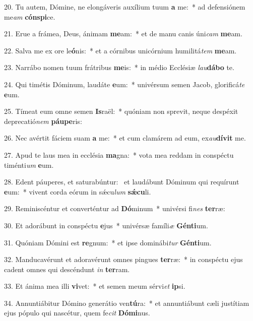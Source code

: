 20. Tu autem, Dómine, ne elongáveris auxílium tuum \textbf{a} me:~*  ad defensiónem me\textit{am} \textbf{cón}\textbf{spi}ce.\

21. Erue a frámea, Deus, ánimam \textbf{me}am:~*  et de manu canis úni\textit{cam} \textbf{me}am.\

22. Salva me ex ore le\textbf{ó}nis:~*  et a córnibus unicórnium humilitá\textit{tem} \textbf{me}am.\

23. Narrábo nomen tuum frátribus \textbf{me}is:~*  in médio Ecclésiæ \textit{lau}\textbf{dá}\textbf{bo} te.\

24. Qui timétis Dóminum, laudáte \textbf{e}um:~*  univérsum semen Jacob, glorificá\textit{te} \textbf{e}um.\

25. Tímeat eum omne semen \textbf{Is}raël:~*  quóniam non sprevit, neque despéxit deprecatió\textit{nem} \textbf{páu}\textbf{pe}ris:\

26. Nec avértit fáciem suam \textbf{a} me:~*  et cum clamárem ad eum, ex\textit{au}\textbf{dí}\textbf{vit} me.\

27. Apud te laus mea in ecclésia \textbf{ma}gna:~*  vota mea reddam in conspéctu timénti\textit{um} \textbf{e}um.\

28. Edent páuperes, et saturabúntur: \dag\  et laudábunt Dóminum qui requírunt \textbf{e}um:~*  vivent corda eórum in sǽcu\textit{lum} \textbf{sǽ}\textbf{cu}li.\

29. Reminiscéntur et converténtur ad \textbf{Dó}minum~*  univérsi fi\textit{nes} \textbf{ter}ræ:\

30. Et adorábunt in conspéctu \textbf{e}jus~*  univérsæ famíli\textit{æ} \textbf{Gén}\textbf{ti}um.\

31. Quóniam Dómini est \textbf{re}gnum:~*  et ipse dominábi\textit{tur} \textbf{Gén}\textbf{ti}um.\

32. Manducavérunt et adoravérunt omnes pingues \textbf{ter}ræ:~*  in conspéctu ejus cadent omnes qui descéndunt \textit{in} \textbf{ter}ram.\

33. Et ánima mea illi \textbf{vi}vet:~*  et semen meum sérvi\textit{et} \textbf{ip}si.\

34. Annuntiábitur Dómino generátio ven\textbf{tú}ra:~*  et annuntiábunt cæli justítiam ejus pópulo qui nascétur, quem fe\textit{cit} \textbf{Dó}\textbf{mi}nus.\

